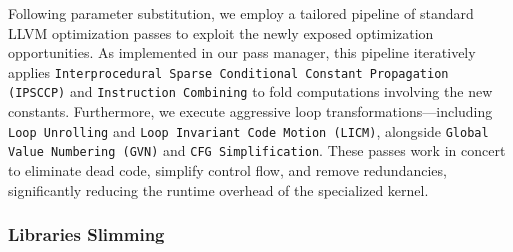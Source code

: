 Following parameter substitution, we employ a tailored pipeline of standard LLVM optimization passes to exploit the newly exposed optimization opportunities. 
As implemented in our pass manager, this pipeline iteratively applies \texttt{Interprocedural Sparse Conditional Constant Propagation (IPSCCP)} and \texttt{Instruction Combining} to fold computations involving the new constants. 
Furthermore, we execute aggressive loop transformations—including \texttt{Loop Unrolling} and \texttt{Loop Invariant Code Motion (LICM)}, alongside \texttt{Global Value Numbering (GVN)} and \texttt{CFG Simplification}. 
These passes work in concert to eliminate dead code, simplify control flow, and remove redundancies, significantly reducing the runtime overhead of the specialized kernel. 

\subsubsection{Libraries Slimming}

